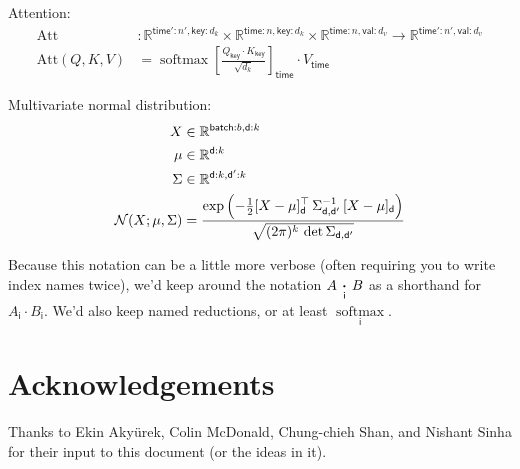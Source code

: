 \documentclass{article}
\newcommand{\name}[1]{\mathsf{#1}}
\newcommand{\nset}[2]{\name{#1}:#2}
\newcommand{\ndot}[1]{\mathbin{\mathop{\thinspace\boldsymbol\cdot\thinspace}\limits_{\name{#1}}}}
\newcommand{\nfun}[2]{\mathop{\text{#2}}\limits_{\name{#1}}}
\DeclareMathOperator*{\softmax}{softmax}
\begin{document}
Attention:
\begin{align*}
  \text{Att} &\colon \mathbb{R}^{\nset{time'}{n'},\nset{key}{d_k}} \times \mathbb{R}^{\nset{time}{n},\nset{key}{d_k}} \times \mathbb{R}^{\nset{time}{n},\nset{val}{d_v}} \rightarrow \mathbb{R}^{\nset{time'}{n'},\nset{val}{d_v}} \\
  \text{Att}(Q,K,V) &= \softmax \left[ \frac{Q_{\name{key}} \cdot K_\name{key}}{\sqrt{d_k}} \right]_{\name{time}} \cdot V_{\name{time}}
\end{align*}

Multivariate normal distribution:
\begin{align*} 
X &\in \mathbb{R}^{\nset{batch}{{b}}, \nset{d}{{k}}}  \\
\mu &\in \mathbb{R}^{{\nset{d}{{k}}}}  \\
\Sigma & \in   \mathbb{R}^{{\nset{d}{k}, \nset{d'}{k}}}  \\
{\cal N}(X; \mu, \Sigma) &= \frac{\displaystyle \exp\left(-\tfrac{1}{2} [X - \mu]_{\name{d}}^\top \, \Sigma_{\name{d},\name{d'}}^{-1} \, [X - \mu]_{\name{d}} \right)}{\sqrt{(2 \pi)^k \, \mathop{\text{det}} \Sigma_{\name{d},\name{d'}}}}
\end{align*}

Because this notation can be a little more verbose (often requiring you to write index names twice), we'd keep around the notation $A \ndot{i} B$ as a shorthand for $A_{\name{i}} \cdot B_{\name{i}}$. We'd also keep named reductions, or at least $\nfun{i}{softmax}$.

\section*{Acknowledgements}

Thanks to Ekin Aky\"{u}rek, Colin McDonald, Chung-chieh Shan, and Nishant Sinha for their input to this document (or the ideas in it).

\iffalse %
\section*{References}
\fi



\end{document}
